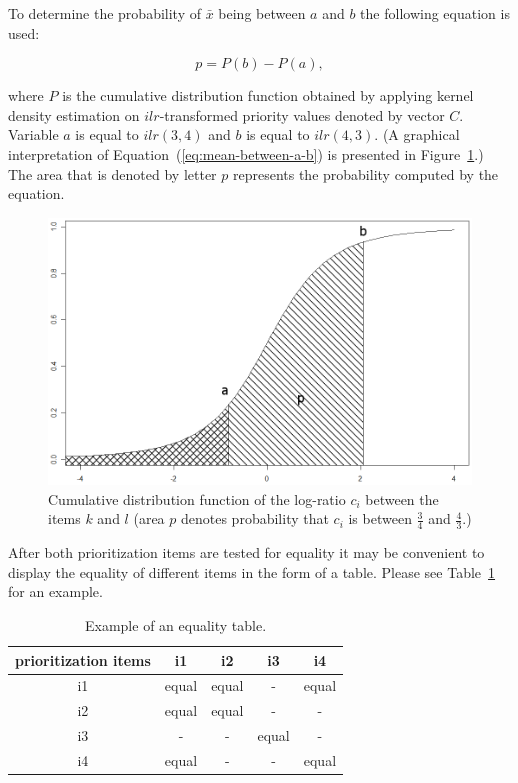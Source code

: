 To determine the probability of $\bar{x}$ being between $a$ and $b$ the following equation is used:

\begin{equation}
	p=P(b)-P(a)\label{eq:mean-between-a-b},
\end{equation}

where $P$ is the cumulative distribution function obtained by applying kernel density estimation on $ilr$-transformed priority values denoted by vector $C$. Variable $a$ is equal to $ilr(3,4)$ and $b$ is equal to $ilr(4,3)$. (A graphical interpretation of Equation~(\ref{eq:mean-between-a-b}) is presented in Figure~\ref{fig:Probability-p-that}.)
The area that is denoted by letter $p$ represents the probability computed by the equation.

\begin{figure}
	\center
\includegraphics[scale=0.2]{fig/p}
\caption{
	\label{fig:Probability-p-that}
	Cumulative distribution function of the log-ratio $c_{i}$ between the items $k$ and $l$ (area $p$ denotes probability that $c_{i}$ is between $\frac{3}{4}$ and $\frac{4}{3}$.)
}
\end{figure}

After both prioritization items are tested for equality it may
be convenient to display the equality of different items in the form of a table.
Please see Table~\ref{tab:ECVexample} for an example.

\begin{table}
	\scriptsize
	\centering
\caption{Example of an equality table.}

\label{tab:ECVexample}
\begin{tabular}{|c|c|c|c|c|}
\hline 
prioritization items & i1 & i2 & i3 & i4\tabularnewline
\hline\hline 
i1 & equal & equal & - & equal\tabularnewline
\hline 
i2 & equal & equal & - & -\tabularnewline
\hline 
i3 & - & - & equal & -\tabularnewline
\hline 
i4 & equal & - & - & equal\tabularnewline
\hline
\end{tabular}
\end{table}

